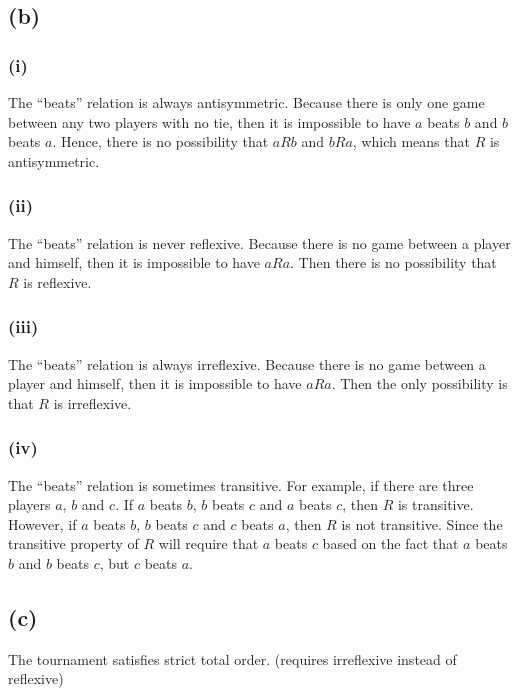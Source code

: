 \documentclass[a4paper,12pt]{article}
\begin{document}
\subsection*{(b)}

\subsubsection*{(i)}

The ``beats'' relation is always antisymmetric.
Because there is only one game between any two players with no tie, then it is impossible to have $a$ beats $b$ and $b$ beats $a$.
Hence, there is no possibility that $aRb$ and $bRa$, which means that $R$ is antisymmetric.

\subsubsection*{(ii)}

The ``beats'' relation is never reflexive.
Because there is no game between a player and himself, then it is impossible to have $aRa$.
Then there is no possibility that $R$ is reflexive.

\subsubsection*{(iii)}

The ``beats'' relation is always irreflexive.
Because there is no game between a player and himself, then it is impossible to have $aRa$.
Then the only possibility is that $R$ is irreflexive.

\subsubsection*{(iv)}

The ``beats'' relation is sometimes transitive.
For example, if there are three players $a$, $b$ and $c$.
If $a$ beats $b$, $b$ beats $c$ and $a$ beats $c$, then $R$ is transitive.
However, if $a$ beats $b$, $b$ beats $c$ and $c$ beats $a$, then $R$ is not transitive.
Since the transitive property of $R$ will require that $a$ beats $c$ based on the fact that $a$ beats $b$ and $b$ beats $c$, but $c$ beats $a$.

\subsection*{(c)}

The tournament satisfies strict total order. (requires irreflexive instead of reflexive)
\end{document}
